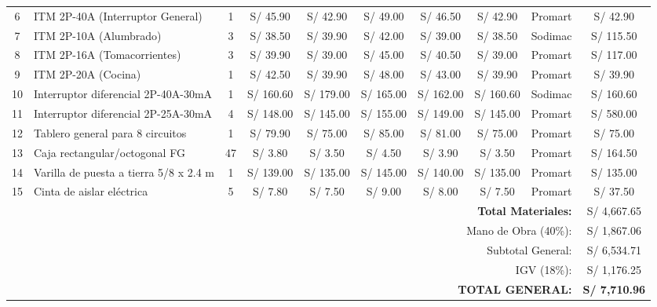 \documentclass[11pt,a4paper]{article}
\begin{document}
\begin{landscape}
\begin{table}[H]
\begin{scriptsize}
\begin{tabularx}{1.30\textwidth}{c X c c c c c c c c}
					6 & ITM 2P-40A (Interruptor General) & 1 &
					S/ 45.90 & S/ 42.90 & S/ 49.00 & S/ 46.50 &
					S/ 42.90 & Promart & S/ 42.90 \\
					
					7 & ITM 2P-10A (Alumbrado) & 3 &
					S/ 38.50 & S/ 39.90 & S/ 42.00 & S/ 39.00 &
					S/ 38.50 & Sodimac & S/ 115.50 \\
					
					8 & ITM 2P-16A (Tomacorrientes) & 3 &
					S/ 39.90 & S/ 39.00 & S/ 45.00 & S/ 40.50 &
					S/ 39.00 & Promart & S/ 117.00 \\
					
					9 & ITM 2P-20A (Cocina) & 1 &
					S/ 42.50 & S/ 39.90 & S/ 48.00 & S/ 43.00 &
					S/ 39.90 & Promart & S/ 39.90 \\
					
					10 & Interruptor diferencial 2P-40A-30mA & 1 &
					S/ 160.60 & S/ 179.00 & S/ 165.00 & S/ 162.00 &
					S/ 160.60 & Sodimac & S/ 160.60 \\
					
					11 & Interruptor diferencial 2P-25A-30mA & 4 &
					S/ 148.00 & S/ 145.00 & S/ 155.00 & S/ 149.00 &
					S/ 145.00 & Promart & S/ 580.00 \\
					
					12 & Tablero general para 8 circuitos & 1 &
					S/ 79.90 & S/ 75.00 & S/ 85.00 & S/ 81.00 &
					S/ 75.00 & Promart & S/ 75.00 \\
					
					13 & Caja rectangular/octogonal FG & 47 &
					S/ 3.80 & S/ 3.50 & S/ 4.50 & S/ 3.90 &
					S/ 3.50 & Promart & S/ 164.50 \\
					
					14 & Varilla de puesta a tierra 5/8 x 2.4 m & 1 &
					S/ 139.00 & S/ 135.00 & S/ 145.00 & S/ 140.00 &
					S/ 135.00 & Promart & S/ 135.00 \\
					
					15 & Cinta de aislar eléctrica & 5 &
					S/ 7.80 & S/ 7.50 & S/ 9.00 & S/ 8.00 &
					S/ 7.50 & Promart & S/ 37.50 \\
					
					\midrule
					
					\multicolumn{9}{r}{\textbf{Total Materiales:}} & S/ 4,667.65 \\
					\multicolumn{9}{r}{Mano de Obra (40\%):} & S/ 1,867.06 \\
					\multicolumn{9}{r}{Subtotal General:} & S/ 6,534.71 \\
					\multicolumn{9}{r}{IGV (18\%):} & S/ 1,176.25 \\
					\multicolumn{9}{r}{\textbf{TOTAL GENERAL:}} & \textbf{S/ 7,710.96} \\
					
					\bottomrule
				\end{tabularx}
				
			\end{scriptsize}
		\end{table}
		
	\end{landscape}
	
\end{document}
